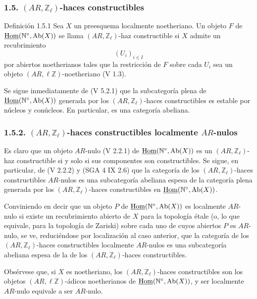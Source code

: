 \subsubsection*{1.5. \((AR,\mathbb Z_\ell)\)-haces constructibles}

\begin{statement}{Definición 1.5.1}
Sea \(X\) un preesquema localmente noetheriano. Un objeto \(F\) de \(\underline{\operatorname{Hom}}(\mathbb N^\circ,\operatorname{Ab}(X))\) se llama \((AR,\mathbb Z_\ell)\)-haz constructible si \(X\) admite un recubrimiento
\[
(U_i)_{i\in I}
\]
por abiertos noetherianos tales que la restricción de \(F\) sobre cada \(U_i\) sea un objeto \((AR,\ell\mathbb Z)\)-noetheriano (V 1.3).
\end{statement}

Se sigue inmediatamente de (V 5.2.1) que la subcategoría plena de \(\underline{\operatorname{Hom}}(\mathbb N^\circ,\operatorname{Ab}(X))\) generada por los \((AR,\mathbb Z_\ell)\)-haces constructibles es estable por núcleos y conúcleos. En particular, es una categoría abeliana.

\subsubsection*{1.5.2. \((AR,\mathbb Z_\ell)\)-haces constructibles localmente \(AR\)-nulos}

Es claro que un objeto \(AR\)-nulo (V 2.2.1) de \(\underline{\operatorname{Hom}}(\mathbb N^\circ,\operatorname{Ab}(X))\) es un \((AR,\mathbb Z_\ell)\)-haz constructible si y solo si sus componentes son constructibles. Se sigue, en particular, de (V 2.2.2) y (SGA 4 IX 2.6) que la categoría de los \((AR,\mathbb Z_\ell)\)-haces constructibles \(AR\)-nulos es una subcategoría abeliana espesa de la categoría plena generada por los \((AR,\mathbb Z_\ell)\)-haces constructibles en \(\underline{\operatorname{Hom}}(\mathbb N^\circ,\operatorname{Ab}(X))\).

Conviniendo en decir que un objeto \(P\) de \(\underline{\operatorname{Hom}}(\mathbb N^\circ,\operatorname{Ab}(X))\) es localmente \(AR\)-nulo si existe un recubrimiento abierto de \(X\) para la topología étale (o, lo que equivale, para la topología de Zariski) sobre cada uno de cuyos abiertos \(P\) es \(AR\)-nulo, se ve, reduciéndose por localización al caso anterior, que la categoría de los \((AR,\mathbb Z_\ell)\)-haces constructibles localmente \(AR\)-nulos es una subcategoría abeliana espesa de la de los \((AR,\mathbb Z_\ell)\)-haces constructibles.

Obsérvese que, si \(X\) es noetheriano, los \((AR,\mathbb Z_\ell)\)-haces constructibles son los objetos \((AR,\ell\mathbb Z)\)-ádicos noetherianos de \(\underline{\operatorname{Hom}}(\mathbb N^\circ,\operatorname{Ab}(X))\), y ser localmente \(AR\)-nulo equivale a ser \(AR\)-nulo.

